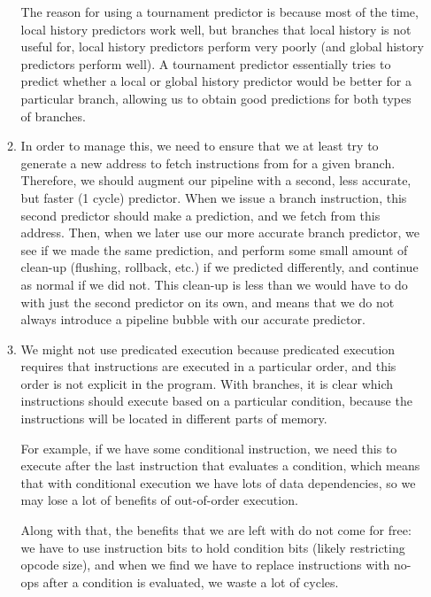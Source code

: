\begin{enumerate}[label=(\alph*)]
\begin{enumerate}[label=(\roman*)]
      The reason for using a tournament predictor is because most of the time, local history predictors work well, but branches that local history is not useful for, local history predictors perform very poorly (and global history predictors perform well). A tournament predictor essentially tries to predict whether a local or global history predictor would be better for a particular branch, allowing us to obtain good predictions for both types of branches.

    \item
      In order to manage this, we need to ensure that we at least try to generate a new address to fetch instructions from for a given branch. Therefore, we should augment our pipeline with a second, less accurate, but faster (1 cycle) predictor. When we issue a branch instruction, this second predictor should make a prediction, and we fetch from this address. Then, when we later use our more accurate branch predictor, we see if we made the same prediction, and perform some small amount of clean-up (flushing, rollback, etc.) if we predicted differently, and continue as normal if we did not. This clean-up is less than we would have to do with just the second predictor on its own, and means that we do not always introduce a pipeline bubble with our accurate predictor.

    \item
      We might not use predicated execution because predicated execution requires that instructions are executed in a particular order, and this order is not explicit in the program. With branches, it is clear which instructions should execute based on a particular condition, because the instructions will be located in different parts of memory.

      For example, if we have some conditional instruction, we need this to execute after the last instruction that evaluates a condition, which means that with conditional execution we have lots of data dependencies, so we may lose a lot of benefits of out-of-order execution.

      Along with that, the benefits that we are left with do not come for free: we have to use instruction bits to hold condition bits (likely restricting opcode size), and when we find we have to replace instructions with no-ops after a condition is evaluated, we waste a lot of cycles.

        
    \end{enumerate}
        
\end{enumerate}

